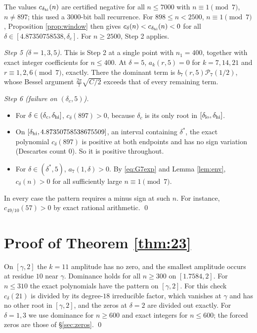 \documentclass[11pt]{amsart}
\theoremstyle{remark}
\newcommand{\cP}{\mathcal P}\newcommand{\cE}{\mathcal E}\newcommand{\e}{\mathrm e}
\begin{document}
The values $c_{\delta_{\rm hi}}(n)$ are certified negative for all $n\le7000$ with $n\equiv1\pmod7$, $n\ne897$; this used a $3000$-bit ball recurrence. For $898\le n<2500$, $n\equiv1\pmod7$, Proposition \ref{prop:window} then gives $c_\delta(n)<c_{\delta_{\rm hi}}(n)<0$ for all $\delta\in[4.87350758538,\delta_c]$. For $n\ge2500$, Step 2 applies.

\emph{Step 5 ($\delta=1,3,5$).} This is Step 2 at a single point with $n_1=400$, together with exact integer coefficients for $n\le400$. At $\delta=5$, $a_k(r,5)=0$ for $k=7,14,21$ and $r\equiv1,2,6\pmod7$, exactly. There the dominant term is $b_7(r,5)\cP_7(1/2)$, whose Bessel argument $\frac{2\pi}7\sqrt{C/2}$ exceeds that of every remaining term.

\emph{Step 6 (failure on $(\delta_c,5)$).}
\begin{itemize}[leftmargin=2em]
\item For $\delta\in(\delta_c,\delta_{\rm hi}]$, $c_\delta(897)>0$, because $\delta_c$ is its only root in $[\delta_{\rm lo},\delta_{\rm hi}]$.
\item On $[\delta_{\rm hi},4.87350758538675509]$, an interval containing $\delta^*$, the exact polynomial $c_\delta(897)$ is positive at both endpoints and has no sign variation (Descartes count $0$). So it is positive throughout.
\item For $\delta\in(\delta^*,5)$, $a_7(1,\delta)>0$. By \eqref{eq:G7exp} and Lemma \ref{lem:env}, $c_\delta(n)>0$ for all sufficiently large $n\equiv1\pmod 7$.
\end{itemize}
In every case the pattern requires a minus sign at such $n$. For instance, $c_{49/10}(57)>0$ by exact rational arithmetic. \qed

\section{Proof of Theorem \ref{thm:23}}\label{sec:23}
On $[\gamma,2]$ the $k=11$ amplitude has no zero, and the smallest amplitude occurs at residue $10$ near $\gamma$. Dominance holds for all $n\ge300$ on $[1.7584,2]$. For $n\le310$ the exact polynomials have the pattern on $[\gamma,2]$. For this check $c_\delta(21)$ is divided by its degree-$18$ irreducible factor, which vanishes at $\gamma$ and has no other root in $[\gamma,2]$, and the zeros at $\delta=2$ are divided out exactly. For $\delta=1,3$ we use dominance for $n\ge600$ and exact integers for $n\le600$; the forced zeros are those of \S\ref{sec:zeros}. \qed
\end{document}
